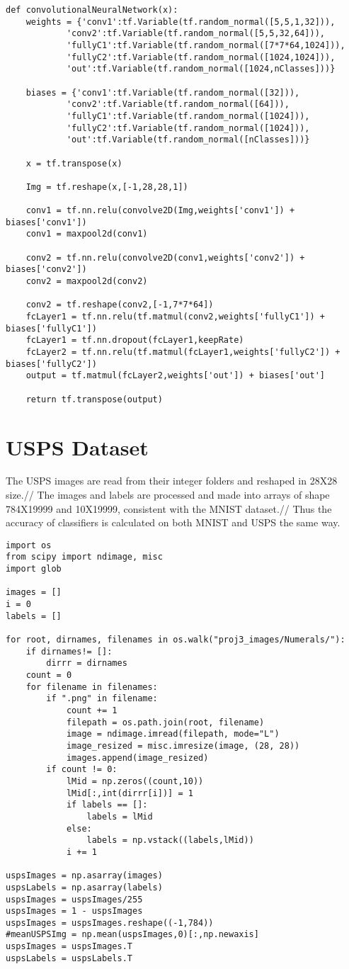\documentclass[a4paper,11pt]{article}
\begin{document}
\begin{lstlisting}[label={list:second}]
def convolutionalNeuralNetwork(x):
	weights = {'conv1':tf.Variable(tf.random_normal([5,5,1,32])),
			'conv2':tf.Variable(tf.random_normal([5,5,32,64])),
			'fullyC1':tf.Variable(tf.random_normal([7*7*64,1024])),
			'fullyC2':tf.Variable(tf.random_normal([1024,1024])),
			'out':tf.Variable(tf.random_normal([1024,nClasses]))}
	
	biases = {'conv1':tf.Variable(tf.random_normal([32])),
			'conv2':tf.Variable(tf.random_normal([64])),
			'fullyC1':tf.Variable(tf.random_normal([1024])),
			'fullyC2':tf.Variable(tf.random_normal([1024])),
			'out':tf.Variable(tf.random_normal([nClasses]))}
	
	x = tf.transpose(x)
	
	Img = tf.reshape(x,[-1,28,28,1])
	
	conv1 = tf.nn.relu(convolve2D(Img,weights['conv1']) + biases['conv1'])
	conv1 = maxpool2d(conv1)
	
	conv2 = tf.nn.relu(convolve2D(conv1,weights['conv2']) + biases['conv2'])
	conv2 = maxpool2d(conv2)
	
	conv2 = tf.reshape(conv2,[-1,7*7*64])
	fcLayer1 = tf.nn.relu(tf.matmul(conv2,weights['fullyC1']) + biases['fullyC1'])
	fcLayer1 = tf.nn.dropout(fcLayer1,keepRate)
	fcLayer2 = tf.nn.relu(tf.matmul(fcLayer1,weights['fullyC2']) + biases['fullyC2'])
	output = tf.matmul(fcLayer2,weights['out']) + biases['out']
	
	return tf.transpose(output)
\end{lstlisting}

\section*{USPS Dataset}

The USPS images are read from their integer folders and reshaped in 28X28 size.//
The images and labels are processed and made into arrays of shape 784X19999 and 10X19999, consistent with the MNIST dataset.//
Thus the accuracy of classifiers is calculated on both MNIST and USPS the same way.

\begin{lstlisting}[label={list:second}]
import os
from scipy import ndimage, misc
import glob

images = []
i = 0   
labels = []

for root, dirnames, filenames in os.walk("proj3_images/Numerals/"):
	if dirnames!= []:
		dirrr = dirnames
	count = 0
	for filename in filenames:
		if ".png" in filename:
			count += 1
			filepath = os.path.join(root, filename)
			image = ndimage.imread(filepath, mode="L")
			image_resized = misc.imresize(image, (28, 28))
			images.append(image_resized)
		if count != 0:
			lMid = np.zeros((count,10))
			lMid[:,int(dirrr[i])] = 1
			if labels == []:
				labels = lMid
			else:
				labels = np.vstack((labels,lMid))
			i += 1
			
uspsImages = np.asarray(images)
uspsLabels = np.asarray(labels)
uspsImages = uspsImages/255
uspsImages = 1 - uspsImages
uspsImages = uspsImages.reshape((-1,784))
#meanUSPSImg = np.mean(uspsImages,0)[:,np.newaxis]
uspsImages = uspsImages.T
uspsLabels = uspsLabels.T
\end{lstlisting}
\end{document}
